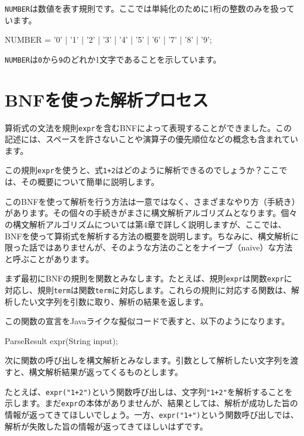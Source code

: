 \texttt{NUMBER}は数値を表す規則です。ここでは単純化のために1桁の整数のみを扱っています。

\begin{codescreen}{}
NUMBER = '0' | '1' | '2' | '3' | '4' | '5' | '6' | '7' | '8' | '9';
\end{codescreen}

\texttt{NUMBER}は\texttt{0}から\texttt{9}のどれか1文字であることを示しています。

\section{BNFを使った解析プロセス}

算術式の文法を規則\texttt{expr}を含むBNFによって表現することができました。この記述には、スペースを許さないことや演算子の優先順位などの概念も含まれています。

この規則\texttt{expr}を使うと、式\texttt{1+2}はどのように解析できるのでしょうか？ここでは、その概要について簡単に説明します。

このBNFを使って解析を行う方法は一意ではなく、さまざまなやり方（手続き）があります。その個々の手続きがまさに構文解析アルゴリズムとなります。個々の構文解析アルゴリズムについては第4章で詳しく説明しますが、ここでは、BNFを使って算術式を解析する方法の概要を説明します。ちなみに、構文解析に限った話ではありませんが、そのような方法のことをナイーブ（naive）な方法と呼ぶことがあります。

まず最初にBNFの規則を関数とみなします。たとえば、規則\texttt{expr}は関数\texttt{expr}に対応し、規則\texttt{term}は関数\texttt{term}に対応します。これらの規則に対応する関数は、解析したい文字列を引数に取り、解析の結果を返します。

この関数の宣言をJavaライクな擬似コードで表すと、以下のようになります。

\begin{codescreen}{}
  ParseResult expr(String input);
\end{codescreen}

次に関数の呼び出しを構文解析とみなします。引数として解析したい文字列を渡すと、構文解析結果が返ってくるものとします。

たとえば、\texttt{expr("1+2")}という関数呼び出しは、文字列\texttt{"1+2"}を解析することを示します。まだ\texttt{expr}の本体がありませんが、結果としては、解析が成功した旨の情報が返ってきてほしいでしょう。一方、\texttt{expr("1+")}という関数呼び出しでは、解析が失敗した旨の情報が返ってきてほしいはずです。

